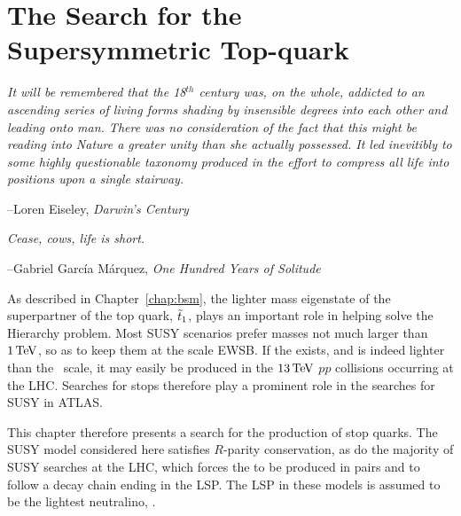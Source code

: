 \chapter{The Search for the Supersymmetric Top-quark}
\label{chap:search_stop}

\epigraph{
\textit{It will be remembered that the 18$^{th}$ century was, on the whole,
addicted to an ascending series of living forms shading by insensible degrees
into each other and leading onto man.
There was no consideration of the fact that this might be reading into Nature a greater
unity than she actually possessed. It led inevitibly to some highly
questionable taxonomy produced in the effort to compress all life into positions upon a
single stairway.}
}
{
--Loren Eiseley, \textit{Darwin's Century}
}

\epigraph{
\textit{Cease, cows, life is short.}
}
{
--Gabriel Garc\'{i}a M\'{a}rquez, \textit{One Hundred Years of Solitude}
}


As described in Chapter~\ref{chap:bsm}, the lighter mass eigenstate of the superpartner of
the top quark, $\tilde{t}_1$, plays an important role in helping solve the Hierarchy problem.
Most SUSY scenarios prefer \stopone masses not much larger than $1\,\text{Te\kern -0.1em V}$, so as to keep them
at the scale EWSB.
If the \stopone exists, and is indeed lighter than the \TeV~scale, it may easily be produced in the $13\,\text{Te\kern -0.1em V}$ $pp$ collisions
occurring at the LHC.
Searches for stops therefore play a prominent role in the searches for SUSY in ATLAS.

This chapter therefore presents a search for the production of stop quarks.
The SUSY model considered here satisfies $R$-parity conservation, as do the majority of SUSY
searches at the LHC, which forces the \stopone to be produced in pairs and to follow
a decay chain ending in the LSP.
The LSP in these models is assumed to be the lightest neutralino, \ninoone.

